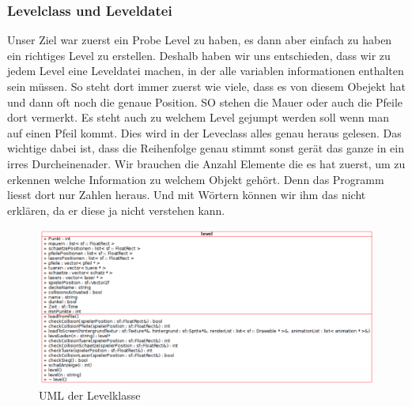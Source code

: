 \documentclass[12pt,a4paper]{scrartcl}
\begin{document}
\subsubsection{Levelclass und Leveldatei}
Unser Ziel war zuerst ein Probe Level zu haben, es dann aber einfach zu haben ein richtiges Level zu erstellen. Deshalb haben wir uns entschieden, dass wir zu jedem Level eine Leveldatei machen, in der alle variablen informationen 
enthalten sein müssen. So steht dort immer zuerst wie viele, dass es von diesem Obejekt hat und dann oft noch die genaue 
Position. SO stehen die Mauer oder auch die Pfeile dort vermerkt. Es steht auch zu welchem Level gejumpt werden soll wenn 
man auf einen Pfeil kommt.
Dies wird in der Leveclass alles genau heraus gelesen. Das wichtige dabei ist, dass die Reihenfolge genau stimmt sonst gerät 
das ganze in ein irres Durcheinenader. Wir brauchen die Anzahl Elemente die es hat zuerst, um zu erkennen welche Information 
zu welchem Objekt gehört. Denn das Programm liesst dort nur Zahlen heraus. Und mit Wörtern können wir ihm das nicht erklären, 
da er diese ja nicht verstehen kann.

\begin{figure}[h]
\centering
\includegraphics[scale=0.45]{img/level_uml.png}
\caption{UML der Levelklasse}
\end{figure}
\end{document}
